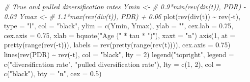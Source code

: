 \documentclass[
]{article}
\newenvironment{Shaded}{\begin{snugshade}}{\end{snugshade}}
\newcommand{\AttributeTok}[1]{\textcolor[rgb]{0.77,0.63,0.00}{#1}}
\newcommand{\CommentTok}[1]{\textcolor[rgb]{0.56,0.35,0.01}{\textit{#1}}}
\newcommand{\DecValTok}[1]{\textcolor[rgb]{0.00,0.00,0.81}{#1}}
\newcommand{\FloatTok}[1]{\textcolor[rgb]{0.00,0.00,0.81}{#1}}
\newcommand{\FunctionTok}[1]{\textcolor[rgb]{0.00,0.00,0.00}{#1}}
\newcommand{\NormalTok}[1]{#1}
\newcommand{\SpecialCharTok}[1]{\textcolor[rgb]{0.00,0.00,0.00}{#1}}
\newcommand{\StringTok}[1]{\textcolor[rgb]{0.31,0.60,0.02}{#1}}
\begin{document}
\begin{Shaded}
\begin{Highlighting}[]
    \CommentTok{\# True and pulled diversification rates Ymin \textless{}{-}}
    \CommentTok{\# 0.9*min(rev(div(t)), PDR) {-} 0.03 Ymax \textless{}{-}}
    \CommentTok{\# 1.1*max(rev(div(t)), PDR) + 0.06}
    \FunctionTok{plot}\NormalTok{(}\FunctionTok{rev}\NormalTok{(}\FunctionTok{div}\NormalTok{(t)) }\SpecialCharTok{\textasciitilde{}} \FunctionTok{rev}\NormalTok{(}\SpecialCharTok{{-}}\NormalTok{t), }\AttributeTok{type =} \StringTok{"l"}\NormalTok{, }\AttributeTok{col =} \StringTok{"black"}\NormalTok{, }\AttributeTok{ylim =} \FunctionTok{c}\NormalTok{(Ymin,}
\NormalTok{        Ymax), }\AttributeTok{ylab =} \StringTok{""}\NormalTok{, }\AttributeTok{cex.lab =} \FloatTok{0.75}\NormalTok{, }\AttributeTok{cex.axis =} \FloatTok{0.75}\NormalTok{, }\AttributeTok{xlab =} \FunctionTok{bquote}\NormalTok{(}\StringTok{"Age ("} \SpecialCharTok{*}
\NormalTok{        tau }\SpecialCharTok{*} \StringTok{")"}\NormalTok{), }\AttributeTok{xaxt =} \StringTok{"n"}\NormalTok{)}
    \FunctionTok{axis}\NormalTok{(}\DecValTok{1}\NormalTok{, }\AttributeTok{at =} \FunctionTok{pretty}\NormalTok{(}\FunctionTok{range}\NormalTok{(}\FunctionTok{rev}\NormalTok{(}\SpecialCharTok{{-}}\NormalTok{t))), }\AttributeTok{labels =} \FunctionTok{rev}\NormalTok{(}\FunctionTok{pretty}\NormalTok{(}\FunctionTok{range}\NormalTok{(}\FunctionTok{rev}\NormalTok{(t)))),}
        \AttributeTok{cex.axis =} \FloatTok{0.75}\NormalTok{)}
    \FunctionTok{lines}\NormalTok{(}\FunctionTok{rev}\NormalTok{(PDR) }\SpecialCharTok{\textasciitilde{}} \FunctionTok{rev}\NormalTok{(}\SpecialCharTok{{-}}\NormalTok{t), }\AttributeTok{col =} \StringTok{"black"}\NormalTok{, }\AttributeTok{lty =} \DecValTok{2}\NormalTok{)}
    \FunctionTok{legend}\NormalTok{(}\StringTok{"topright"}\NormalTok{, }\AttributeTok{legend =} \FunctionTok{c}\NormalTok{(}\StringTok{"diversification rate"}\NormalTok{, }\StringTok{"pulled diversification rate"}\NormalTok{),}
        \AttributeTok{lty =} \FunctionTok{c}\NormalTok{(}\DecValTok{1}\NormalTok{, }\DecValTok{2}\NormalTok{), }\AttributeTok{col =} \FunctionTok{c}\NormalTok{(}\StringTok{"black"}\NormalTok{), }\AttributeTok{bty =} \StringTok{"n"}\NormalTok{, }\AttributeTok{cex =} \FloatTok{0.5}\NormalTok{)}


\end{Highlighting}
\end{Shaded}
\end{document}
